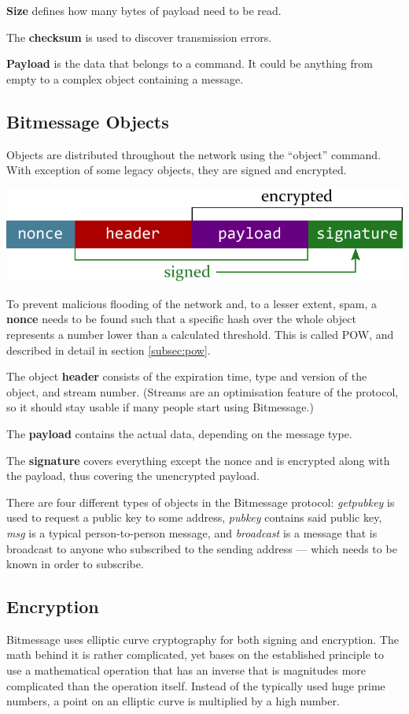 \documentclass{bfh}
\begin{document}
  \textbf{Size} defines how many bytes of payload need to be read.

  The \textbf{checksum} is used to discover transmission errors.

  \textbf{Payload} is the data that belongs to a command. It could be anything from empty to a complex object containing a message.


  \subsection{Bitmessage Objects}
  Objects are distributed throughout the network using the ``object'' command. With exception of some legacy objects, they are signed and encrypted.

  \includegraphics[width=\textwidth]{images/object.pdf}

  To prevent malicious flooding of the network and, to a lesser extent, spam, a \textbf{nonce} needs to be found such that a specific hash over the whole object represents a number lower than a calculated threshold. This is called \acf{POW}, and described in detail in section \ref{subsec:pow}.

  The object \textbf{header} consists of the expiration time, type and version of the object, and stream number. (Streams are an optimisation feature of the protocol, so it should stay usable if many people start using Bitmessage.)
  
  The \textbf{payload} contains the actual data, depending on the message type.
  
  The \textbf{signature} covers everything except the nonce and is encrypted along with the payload, thus covering the unencrypted payload.

  There are four different types of objects in the Bitmessage protocol: \textit{getpubkey} is used to request a public key to some address, \textit{pubkey} contains said public key, \textit{msg} is a typical person-to-person message, and \textit{broadcast} is a message that is broadcast to anyone who subscribed to the sending address --- which needs to be known in order to subscribe.


  \subsection{Encryption}
  \label{subsec:encryption}
  Bitmessage uses elliptic curve cryptography for both signing and encryption. The math behind it is rather complicated, yet bases on the established principle to use a mathematical operation that has an inverse that is magnitudes more complicated than the operation itself. Instead of the typically used huge prime numbers, a point on an elliptic curve is multiplied by a high number.
\end{document}
